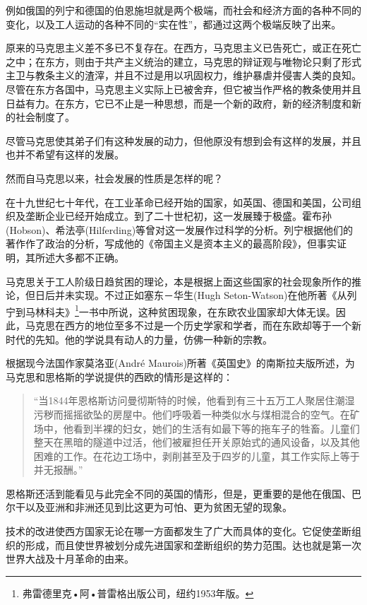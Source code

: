 \documentclass[12pt,oneside]{book}
\begin{document}
\begin{common-format}
例如俄国的列宁和德国的伯恩施坦就是两个极端，而社会和经济方面的各种不同的变化，以及工人运动的各种不同的“实在性”，都通过这两个极端反映了出来。

原来的马克思主义差不多已不复存在。在西方，马克思主义已告死亡，或正在死亡之中；在东方，则由于共产主义统治的建立，马克思的辩证观与唯物论只剩了形式主卫与教条主义的渣滓，并且不过是用以巩固权力，维护暴虐并侵害人类的良知。尽管在东方各国中，马克思主义实际上已被舍弃，但它被当作严格的教条使用并且日益有力。在东方，它已不止是一种思想，而是一个新的政府，新的经济制度和新的社会制度了。

尽管马克思使其弟子们有这种发展的动力，但他原没有想到会有这样的发展，并且也并不希望有这样的发展。

然而自马克思以来，社会发展的性质是怎样的呢？

在十九世纪七十年代，在工业革命已经开始的国家，如英国、德国和美国，公司组织及垄断企业已经开始成立。到了二十世杞初，这一发展臻于极盛。霍布孙(Hobson)、希法亭(Hilferding)等曾对这一发展作过科学的分析。列宁根据他们的著作作了政治的分析，写成他的《帝国主义是资本主义的最高阶段》，但事实证明，其所述大多都不正确。

马克思关于工人阶级日趋贫困的理论，本是根据上面这些国家的社会现象所作的推论，但日后并未实现。不过正如塞东－华生(Hugh Seton-Watson)在他所著《从列宁到马林科夫》\footnote{弗雷德里克•阿•普雷格出版公司，纽约1953年版。}一书中所说，这种贫困现象，在东欧农业国家却大体无误。因此，马克思在西方的地位至多不过是一个历史学家和学者，而在东欧却等于一个新时代的先知。他的学说具有动人的力量，仿佛一种新的宗教。

根据现今法国作家莫洛亚(André Maurois)所著《英国史》的南斯拉夫版所述，为马克思和思格斯的学说提供的西欧的情形是这样的：
\begin{quotation}
“当1844年恩格斯访问曼彻斯特的时候，他看到有三十五万工人聚居住潮湿污秽而摇摇欲坠的房屋中。他们呼吸着一种类似水与煤相混合的空气。在矿场中，他看到半裸的妇女，她们的生活有如最下等的拖车子的牲畜。儿童们整天在黑暗的隧道中过活，他们被雇担任开关原始式的通风设备，以及其他困难的工作。在花边工场中，剥削甚至及于四岁的儿童，其工作实际上等于并无报酬。”
\end{quotation}

恩格斯还活到能看见与此完全不同的英国的情形，但是，更重要的是他在俄国、巴尔干以及亚洲和非洲还见到比这更为可怕、更为贫困无望的现象。

技术的改进使西方国家无论在哪一方面都发生了广大而具体的变化。它促使垄断组织的形成，而且使世界被划分成先进国家和垄断组织的势力范围。达也就是第一次世界大战及十月革命的由来。


\end{common-format}
\end{document}
